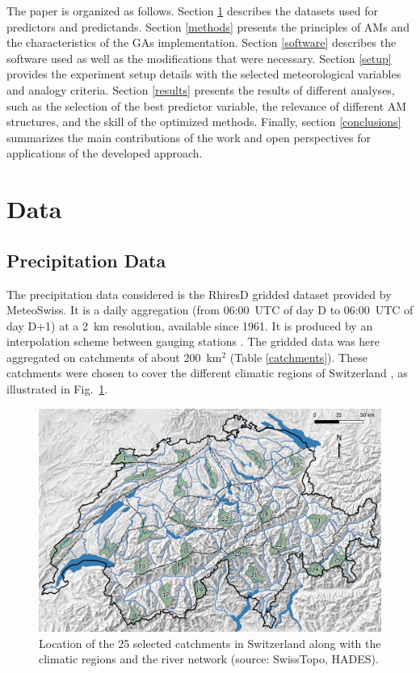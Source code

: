 \documentclass[draft]{agujournal2019}
\begin{document}
The paper is organized as follows. Section \ref{data} describes the datasets used for predictors and predictands. Section \ref{methods} presents the principles of AMs and the characteristics of the GAs implementation. Section \ref{software} describes the software used as well as the modifications that were necessary. Section \ref{setup} provides the experiment setup details with the selected meteorological variables and analogy criteria. Section \ref{results} presents the results of different analyses, such as the selection of the best predictor variable, the relevance of different AM structures, and the skill of the optimized methods. Finally, section \ref{conclusions} summarizes the main contributions of the work and open perspectives for applications of the developed approach.


\section{Data}
\label{data}

\subsection{Precipitation Data}
\label{precip}

The precipitation data considered is the RhiresD gridded dataset provided by MeteoSwiss. It is a daily aggregation (from 06:00~UTC of day D to 06:00~UTC of day D+1) at a 2~km resolution, available since 1961. It is produced by an interpolation scheme between gauging stations \cite{Frei1998}. The gridded data was here aggregated on catchments of about 200~km$^2$ (Table \ref{catchments}). These catchments were chosen to cover the different climatic regions of Switzerland \cite{Schuepp1980}, as illustrated in Fig.~\ref{map}.


\begin{figure}[hbt]
	\noindent\includegraphics[width=140mm]{figures/map.jpg}
	\caption{Location of the 25 selected catchments in Switzerland along with the climatic regions and the river network (source: SwissTopo, HADES).}
	\label{map}
\end{figure}
\end{document}
